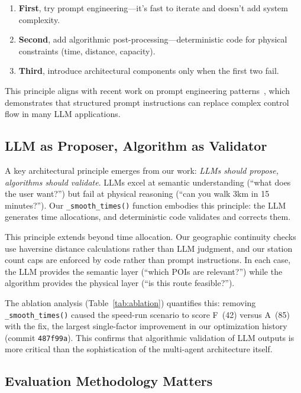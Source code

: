 \begin{enumerate}[leftmargin=*]
    \item \textbf{First}, try prompt engineering---it's fast to iterate and doesn't add system complexity.
    \item \textbf{Second}, add algorithmic post-processing---deterministic code for physical constraints (time, distance, capacity).
    \item \textbf{Third}, introduce architectural components only when the first two fail.
\end{enumerate}

This principle aligns with recent work on prompt engineering patterns~\cite{white2023prompt}, which demonstrates that structured prompt instructions can replace complex control flow in many LLM applications.

\subsection{LLM as Proposer, Algorithm as Validator}

A key architectural principle emerges from our work: \textit{LLMs should propose, algorithms should validate}. LLMs excel at semantic understanding (``what does the user want?'') but fail at physical reasoning (``can you walk 3km in 15 minutes?''). Our \texttt{\_smooth\_times()} function embodies this principle: the LLM generates time allocations, and deterministic code validates and corrects them.

This principle extends beyond time allocation. Our geographic continuity checks use haversine distance calculations rather than LLM judgment, and our station count caps are enforced by code rather than prompt instructions. In each case, the LLM provides the semantic layer (``which POIs are relevant?'') while the algorithm provides the physical layer (``is this route feasible?'').

The ablation analysis (Table~\ref{tab:ablation}) quantifies this: removing \texttt{\_smooth\_times()} caused the speed-run scenario to score F~(42) versus A~(85) with the fix, the largest single-factor improvement in our optimization history (commit \texttt{487f99a}). This confirms that algorithmic validation of LLM outputs is more critical than the sophistication of the multi-agent architecture itself.

\subsection{Evaluation Methodology Matters}

